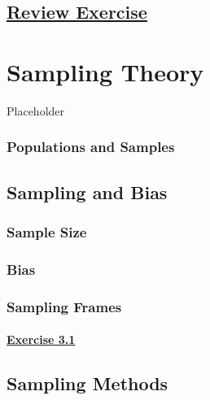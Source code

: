 \documentclass[
  11pt,
]{book}
\begin{document}
\section*{\texorpdfstring{\hyperref[re2a]{Review Exercise}}{Review Exercise}}\label{review-exercise-1}

\chapter{Sampling Theory}\label{sampling-theory}

Placeholder

\subsection*{Populations and Samples}\label{populations-and-samples}

\section{Sampling and Bias}\label{sampling-and-bias}

\subsection*{Sample Size}\label{sample-size}

\subsection*{Bias}\label{bias}

\subsection*{Sampling Frames}\label{sampling-frames}

\subsubsection*{\texorpdfstring{\hyperref[ex31a]{Exercise 3.1}}{Exercise 3.1}}\label{exercise-3.1}

\section{Sampling Methods}\label{sampling-methods}
\end{document}
